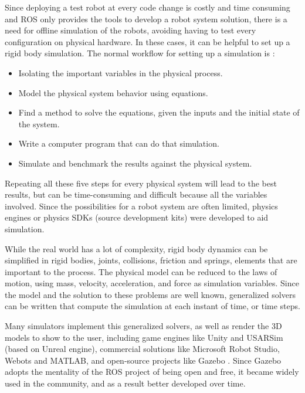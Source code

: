 Since deploying a test robot at every code change is costly and time consuming and ROS only provides the tools to develop a robot system solution, there is a need for offline simulation of the robots, avoiding having to test every configuration on physical hardware. In these cases, it can be helpful to set up a rigid body simulation. The normal workflow for setting up a simulation is \cite{russell2004}:

\begin{itemize}
    \item Isolating the important variables in the physical process.
    \item Model the physical system behavior using equations.
    \item Find a method to solve the equations, given the inputs and the initial state of the system.
    \item Write a computer program that can do that simulation.
    \item Simulate and benchmark the results against the physical system.
\end{itemize}

Repeating all these five steps for every physical system will lead to the best results, but can be time-consuming and difficult because all the variables involved. Since the possibilities for a robot system are often limited, physics engines or physics SDKs (source development kits) were developed to aid simulation.

While the real world has a lot of complexity, rigid body dynamics can be simplified in rigid bodies, joints, collisions, friction and springs, elements that are important to the process. The physical model can be reduced to the laws of motion, using mass, velocity, acceleration, and force as simulation variables. Since the model and the solution to these problems are well known, generalized solvers can be written that compute the simulation at each instant of time, or time steps.

Many simulators implement this generalized solvers, as well as render the 3D models to show to the user, including game engines like Unity and USARSim (based on Unreal engine), commercial solutions like Microsoft Robot Studio, Webots and MATLAB, and open-source projects like Gazebo \cite{craighead2007survey}. Since Gazebo adopts the mentality of the ROS project of being open and free, it became widely used in the community, and as a result better developed over time.

